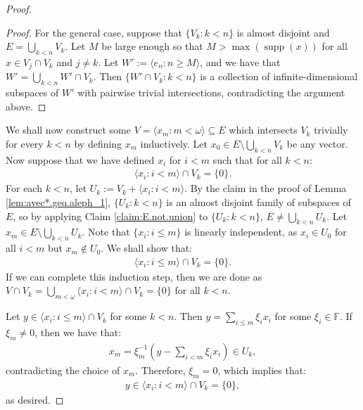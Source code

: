 \documentclass[10pt,a4paper]{amsart}
\theoremstyle{plain}
\numberwithin{equation}{section}
\theoremstyle{definition}
\newcommand{\func}{\operatorname}
\renewcommand{\c}[1]{\langle #1 \rangle}
\newcommand{\bb}[1]{\left( #1 \right)}
\newcommand{\supp}{\func{supp}}
\newenvironment{midproof}[1][Proof]
  {\begin{proof}[#1]\renewcommand{\qedsymbol}{$\blacksquare$}}
  {\end{proof}}
\begin{document}
\begin{proof}
\begin{midproof}
        For the general case, suppose that $\{V_k : k < n\}$ is almost disjoint and $E = \bigcup_{k<n} V_k$. Let $M$ be large enough so that $M > \max(\supp(x))$ for all $x \in V_j \cap V_k$ and $j \neq k$. Let $W' := \c{e_n : n \geq M}$, and we have that $W' = \bigcup_{k<n} W' \cap V_k$. Then $\{W' \cap V_k : k < n\}$ is a collection of infinite-dimensional subspaces of $W'$ with pairwise trivial intersections, contradicting the argument above.
    \end{midproof}

    We shall now construct some $V = \c{x_m : m < \omega} \subseteq E$ which intersects $V_k$ trivially for every $k < n$ by defining $x_m$ inductively. Let $x_0 \in E \setminus \bigcup_{k<n} V_k$ be any vector. Now suppose that we have defined $x_i$ for $i < m$ such that for all $k < n$:
    \begin{align*}
        \c{x_i : i < m} \cap V_k = \{0\}.
    \end{align*}
    For each $k < n$, let $U_k := V_k + \c{x_i : i < m}$. By the claim in the proof of Lemma \ref{lem:avec*.geq.aleph_1}, $\{U_k : k < n\}$ is an almost disjoint family of subspaces of $E$, so by applying Claim \ref{claim:E.not.union} to $\{U_k : k < n\}$, $E \neq \bigcup_{k<n} U_k$. Let $x_m \in E \setminus \bigcup_{k<n} U_k$. Note that $\{x_i : i \leq m\}$ is linearly independent, as $x_i \in U_0$ for all $i < m$ but $x_m \notin U_0$. We shall show that:
    \begin{align*}
        \c{x_i : i \leq m} \cap V_k = \{0\}.
    \end{align*}
    If we can complete this induction step, then we are done as $V \cap V_k = \bigcup_{m<\omega} \c{x_i : i < m} \cap V_k = \{0\}$ for all $k < n$.
    
    Let $y \in \c{x_i : i \leq m} \cap V_k$ for some $k < n$. Then $y = \sum_{i \leq m} \xi_i x_i$ for some $\xi_i \in \mathbb{F}$. If $\xi_m \neq 0$, then we have that:
    \begin{align*}
        x_m = \xi_m^{-1}\bb{y - \sum_{i<m} \xi_i x_i} \in U_k,
    \end{align*}
    contradicting the choice of $x_m$. Therefore, $\xi_m = 0$, which implies that:
    \begin{align*}
        y \in \c{x_i : i < m} \cap V_k = \{0\},
    \end{align*}
    as desired. 
\end{proof}
\end{document}
